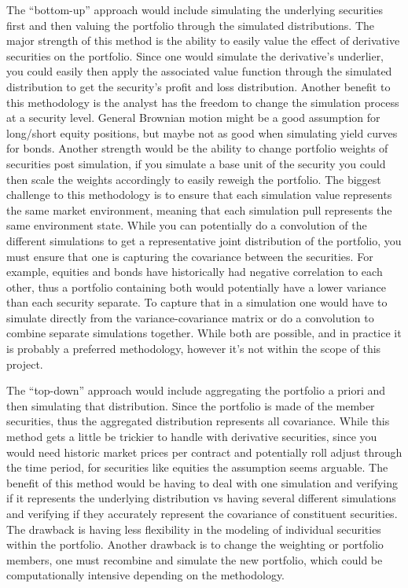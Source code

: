 \documentclass[letterpaper,10pt,english]{sphinxmanual}
\begin{document}
The “bottom-up” approach would include simulating the underlying
securities first and then valuing the portfolio through the simulated
distributions. The major strength of this method is the ability to
easily value the effect of derivative securities on the portfolio. Since
one would simulate the derivative’s underlier, you could easily then
apply the associated value function through the simulated distribution
to get the security’s profit and loss distribution. Another benefit to
this methodology is the analyst has the freedom to change the simulation
process at a security level. General Brownian motion might be a good
assumption for long/short equity positions, but maybe not as good when
simulating yield curves for bonds. Another strength would be the ability
to change portfolio weights of securities post simulation, if you
simulate a base unit of the security you could then scale the weights
accordingly to easily reweigh the portfolio. The biggest challenge to
this methodology is to ensure that each simulation value represents the
same market environment, meaning that each simulation pull represents
the same environment state. While you can potentially do a convolution
of the different simulations to get a representative joint distribution
of the portfolio, you must ensure that one is capturing the covariance
between the securities. For example, equities and bonds have
historically had negative correlation to each other, thus a portfolio
containing both would potentially have a lower variance than each
security separate. To capture that in a simulation one would have to
simulate directly from the variance-covariance matrix or do a
convolution to combine separate simulations together. While both are
possible, and in practice it is probably a preferred methodology,
however it’s not within the scope of this project.

The “top-down” approach would include aggregating the portfolio a priori
and then simulating that distribution. Since the portfolio is made of
the member securities, thus the aggregated distribution represents all
covariance. While this method gets a little be trickier to handle with
derivative securities, since you would need historic market prices per
contract and potentially roll adjust through the time period, for
securities like equities the assumption seems arguable. The benefit of
this method would be having to deal with one simulation and verifying if
it represents the underlying distribution vs having several different
simulations and verifying if they accurately represent the covariance of
constituent securities. The drawback is having less flexibility in the
modeling of individual securities within the portfolio. Another drawback
is to change the weighting or portfolio members, one must recombine and
simulate the new portfolio, which could be computationally intensive
depending on the methodology.
\end{document}
